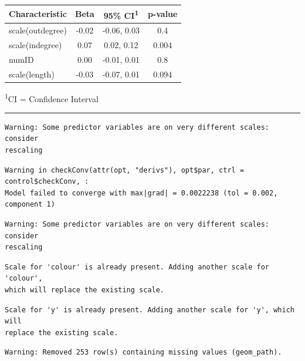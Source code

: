\documentclass[
  .7em,
  letterpaper,
  DIV=11,
  numbers=noendperiod]{scrartcl}
\begin{document}
\captionsetup[table]{labelformat=empty,skip=1pt}
\setlength{\LTpost}{0mm}
\begin{longtable}{lccc}
\toprule
\textbf{Characteristic} & \textbf{Beta} & \textbf{95\% CI}\textsuperscript{1} & \textbf{p-value} \\ 
\midrule
scale(outdegree) & -0.02 & -0.06, 0.03 & 0.4 \\ 
scale(indegree) & 0.07 & 0.02, 0.12 & 0.004 \\ 
numID & 0.00 & -0.01, 0.01 & 0.8 \\ 
scale(length) & -0.03 & -0.07, 0.01 & 0.094 \\ 
\bottomrule
\end{longtable}
\begin{minipage}{\linewidth}
\textsuperscript{1}CI = Confidence Interval\\
\end{minipage}

\begin{center}\rule{0.5\linewidth}{0.5pt}\end{center}

\begin{verbatim}
Warning: Some predictor variables are on very different scales: consider
rescaling
\end{verbatim}

\begin{verbatim}
Warning in checkConv(attr(opt, "derivs"), opt$par, ctrl = control$checkConv, :
Model failed to converge with max|grad| = 0.0022238 (tol = 0.002, component 1)
\end{verbatim}

\begin{verbatim}
Warning: Some predictor variables are on very different scales: consider
rescaling
\end{verbatim}

\begin{verbatim}
Scale for 'colour' is already present. Adding another scale for 'colour',
which will replace the existing scale.
\end{verbatim}

\begin{verbatim}
Scale for 'y' is already present. Adding another scale for 'y', which will
replace the existing scale.
\end{verbatim}

\begin{verbatim}
Warning: Removed 253 row(s) containing missing values (geom_path).
\end{verbatim}
\end{document}
